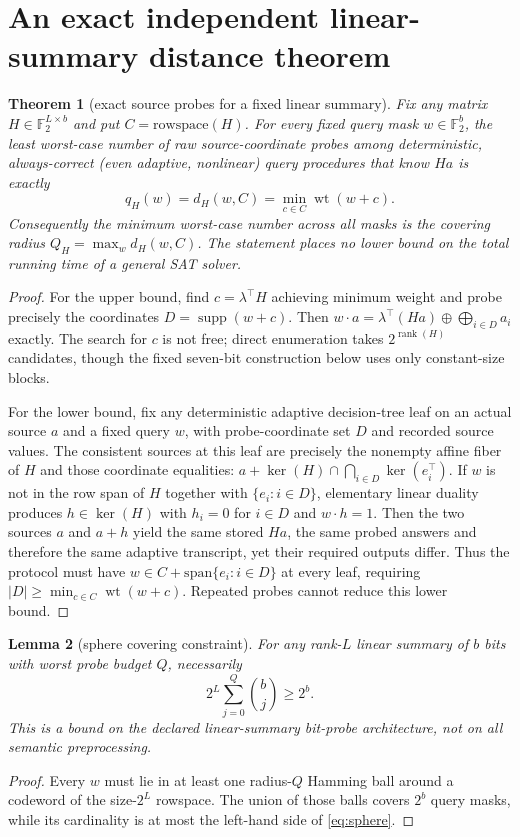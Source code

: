 \documentclass[10pt]{article}
\newtheorem{theorem}{Theorem}
\newtheorem{lemma}[theorem]{Lemma}
\newcommand{\F}{\mathbb F_2}
\begin{document}
\section{An exact independent linear-summary distance theorem}
\begin{theorem}[exact source probes for a fixed linear summary]\label{th:distance}
Fix any matrix $H\in\F^{L\times b}$ and put $C=\mathrm{rowspace}(H)$. For every fixed query mask $w\in\F^b$, the least worst-case number of raw source-coordinate probes among deterministic, always-correct (even adaptive, nonlinear) query procedures that know $Ha$ is exactly
\[
 q_H(w)=d_H(w,C)=\min_{c\in C}\operatorname{wt}(w+c).
\]
Consequently the minimum worst-case number across all masks is the covering radius $Q_H=\max_w d_H(w,C)$. The statement places \emph{no} lower bound on the total running time of a general SAT solver.
\end{theorem}
\begin{proof}
For the upper bound, find $c=\lambda^\top H$ achieving minimum weight and probe precisely the coordinates $D=\operatorname{supp}(w+c)$. Then $w\cdot a=\lambda^\top(Ha)\oplus\bigoplus_{i\in D}a_i$ exactly. The search for $c$ is not free; direct enumeration takes $2^{\operatorname{rank}(H)}$ candidates, though the fixed seven-bit construction below uses only constant-size blocks.

For the lower bound, fix any deterministic adaptive decision-tree leaf on an actual source $a$ and a fixed query $w$, with probe-coordinate set $D$ and recorded source values. The consistent sources at this leaf are precisely the nonempty affine fiber of $H$ and those coordinate equalities: $a+\ker(H)\cap\bigcap_{i\in D}\ker(e_i^\top)$. If $w$ is not in the row span of $H$ together with $\{e_i:i\in D\}$, elementary linear duality produces $h\in\ker(H)$ with $h_i=0$ for $i\in D$ and $w\cdot h=1$. Then the two sources $a$ and $a+h$ yield the same stored $Ha$, the same probed answers and therefore the same adaptive transcript, yet their required outputs differ. Thus the protocol must have $w\in C+\mathrm{span}\{e_i:i\in D\}$ at every leaf, requiring $|D|\ge\min_{c\in C}\operatorname{wt}(w+c)$. Repeated probes cannot reduce this lower bound.
\end{proof}

\begin{lemma}[sphere covering constraint]
For any rank-$L$ linear summary of $b$ bits with worst probe budget $Q$, necessarily
\begin{equation}\label{eq:sphere}
2^L\sum_{j=0}^Q {b\choose j}\ge 2^b.
\end{equation}
This is a bound on the declared \emph{linear-summary bit-probe} architecture, not on all semantic preprocessing.
\end{lemma}
\begin{proof}
Every $w$ must lie in at least one radius-$Q$ Hamming ball around a codeword of the size-$2^L$ rowspace. The union of those balls covers $2^b$ query masks, while its cardinality is at most the left-hand side of \eqref{eq:sphere}.
\end{proof}
\end{document}
